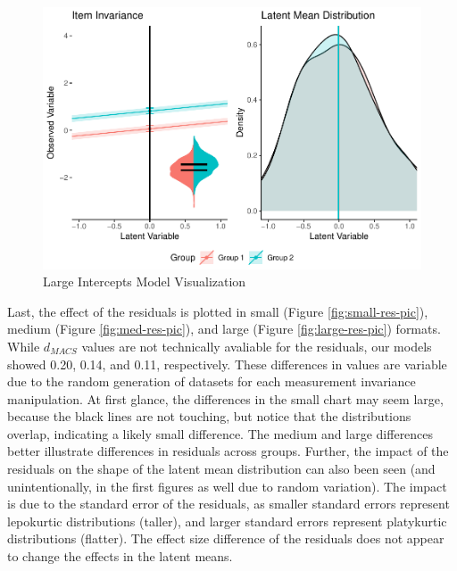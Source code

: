 \documentclass[
  man]{apa6}
\begin{document}
\begin{figure}
\centering
\includegraphics{manuscript_files/figure-latex/large-int-pic-1.pdf}
\caption{\label{fig:large-int-pic}Large Intercepts Model Visualization}
\end{figure}

Last, the effect of the residuals is plotted in small (Figure \ref{fig:small-res-pic}), medium (Figure \ref{fig:med-res-pic}), and large (Figure \ref{fig:large-res-pic}) formats. While \(d_{MACS}\) values are not technically avaliable for the residuals, our models showed 0.20, 0.14, and 0.11, respectively. These differences in values are variable due to the random generation of datasets for each measurement invariance manipulation. At first glance, the differences in the small chart may seem large, because the black lines are not touching, but notice that the distributions overlap, indicating a likely small difference. The medium and large differences better illustrate differences in residuals across groups. Further, the impact of the residuals on the shape of the latent mean distribution can also been seen (and unintentionally, in the first figures as well due to random variation). The impact is due to the standard error of the residuals, as smaller standard errors represent lepokurtic distributions (taller), and larger standard errors represent platykurtic distributions (flatter). The effect size difference of the residuals does not appear to change the effects in the latent means.
\end{document}
